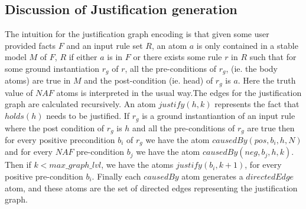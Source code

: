 \documentclass{article}
\begin{document}
\subsection{Discussion of Justification generation}
The intuition for the justification graph encoding is that given some user provided facts $F$ and an input rule set $R$, an atom $a$ is only contained in a stable model $M$ of $F$, $R$ if either $a$ is in $F$ or there exists some rule $r$ in $R$ such that for some ground instantiation $r_{g}$ of $r$, all the pre-conditions of $r_{g}$, (ie. the body atoms) are true in $M$ and the post-condition (ie. head) of $r_{g}$ is $a$. Here the truth value of $NAF$ atoms is interpreted in the usual way.The edges for the justification graph are calculated recursively. An atom $justify(h,k)$ represents the fact that $holds(h)$ needs to be justified. If $r_{g}$ is a ground instantiantion of an input rule where the post condition of $r_{g}$ is $h$ and all the pre-conditions of $r_{g}$ are true then for every positive precondition $b_{i}$ of $r_{g}$ we have the atom $causedBy(pos,b_{i},h,N)$ and for every $NAF$ pre-condition $b_{j}$ we have the atom $causedBy(neg,b_{j},h,k)$. Then if $k<max\_graph\_lvl$, we have the atoms $justify(b_{i},k+1)$, for every positive pre-condition $b_{i}$. Finally each $causedBy$ atom generates a $directedEdge$ atom, and these atoms are the set of directed edges representing the justification graph. 
\end{document}
